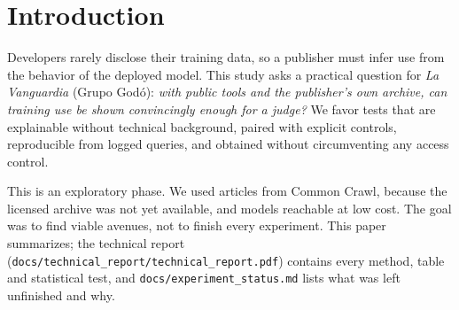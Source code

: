 \documentclass[10pt,a4paper]{article}
\begin{document}
\section{Introduction}
Developers rarely disclose their training data, so a publisher must infer use from the behavior of the deployed
model. This study asks a practical question for \emph{La Vanguardia} (Grupo God\'o): \emph{with public tools and the
publisher's own archive, can training use be shown convincingly enough for a judge?} We favor tests that are
explainable without technical background, paired with explicit controls, reproducible from logged queries, and
obtained without circumventing any access control.

This is an exploratory phase. We used articles from Common Crawl, because the licensed archive was not yet
available, and models reachable at low cost. The goal was to find viable avenues, not to finish every experiment.
This paper summarizes; the technical report (\texttt{docs/technical\_report/technical\_report.pdf}) contains every
method, table and statistical test, and \texttt{docs/experiment\_status.md} lists what was left unfinished and why.
\end{document}
